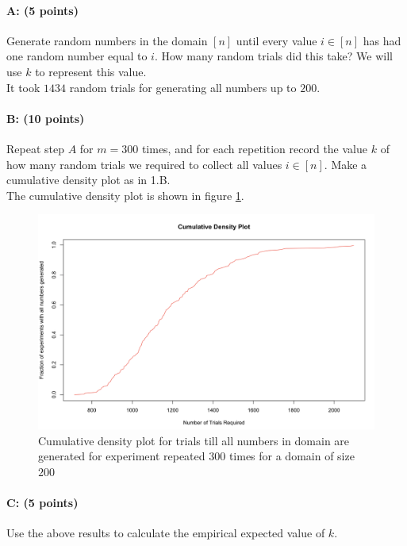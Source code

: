 \documentclass[11pt]{article}
\begin{document}
\paragraph{A: (5 points)}
Generate random numbers in the domain $[n]$ until every value $i \in [n]$ has had one random number equal to $i$.
How many random trials did this take?  
We will use $k$ to represent this value.  \\

It took $1434$ random trials for generating all numbers up to $200$.

\paragraph{B: (10 points)}
Repeat step $A$ for $m=300$ times, and for each repetition record the value $k$ of how many random trials we required to collect all values $i \in [n]$.  
Make a cumulative density plot as in 1.B.  \\

The cumulative density plot is shown in figure \ref{cumplot2}.

\begin{figure}[!htb]
\centering
\includegraphics[width=5.5in]{figures/cumdenplot2b.png}
\caption{Cumulative density plot for trials till all numbers in domain are generated for experiment repeated $300$ times for a domain of size $200$}
\label{cumplot2}
\end{figure}

\paragraph{C: (5 points)}
Use the above results to calculate the empirical expected value of $k$.\\
\end{document}

